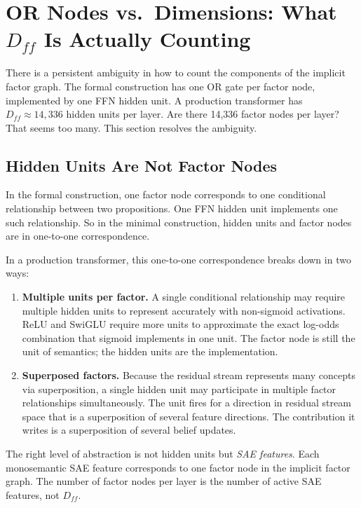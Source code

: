 \section{OR Nodes vs.\ Dimensions: What $D_{ff}$ Is Actually Counting}
\label{sec:or-nodes-dimensions}

There is a persistent ambiguity in how to count the components of the implicit
factor graph. The formal construction has one OR gate per factor node, implemented
by one FFN hidden unit. A production transformer has $D_{ff} \approx 14{,}336$
hidden units per layer. Are there 14,336 factor nodes per layer? That seems too
many. This section resolves the ambiguity.

\subsection*{Hidden Units Are Not Factor Nodes}

In the formal construction, one factor node corresponds to one conditional
relationship between two propositions. One FFN hidden unit implements one such
relationship. So in the minimal construction, hidden units and factor nodes are
in one-to-one correspondence.

In a production transformer, this one-to-one correspondence breaks down in two
ways:

\begin{enumerate}
\item \textbf{Multiple units per factor.} A single conditional relationship may
require multiple hidden units to represent accurately with non-sigmoid activations.
ReLU and SwiGLU require more units to approximate the exact log-odds combination
that sigmoid implements in one unit. The factor node is still the unit of
semantics; the hidden units are the implementation.

\item \textbf{Superposed factors.} Because the residual stream represents many
concepts via superposition, a single hidden unit may participate in multiple
factor relationships simultaneously. The unit fires for a direction in residual
stream space that is a superposition of several feature directions. The
contribution it writes is a superposition of several belief updates.
\end{enumerate}

The right level of abstraction is not hidden units but \emph{SAE features}. Each
monosemantic SAE feature corresponds to one factor node in the implicit factor
graph. The number of factor nodes per layer is the number of active SAE features,
not $D_{ff}$.

